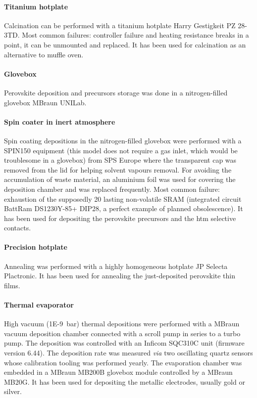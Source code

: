		\paragraph{Titanium hotplate}
		Calcination can be performed with a titanium hotplate Harry Gestigkeit PZ 28-3TD.
		Most common failures: controller failure and heating resistance breaks in a point, it can be unmounted and replaced.
		It has been used for calcination as an alternative to muffle oven.

		\paragraph{Glovebox}
		Perovskite deposition and precursors storage was done in a nitrogen-filled glovebox MBraun UNILab.

		\paragraph{Spin coater in inert atmosphere}
		Spin coating depositions in the nitrogen-filled glovebox were performed with a SPIN150 equipment (this model does not require a gas inlet, which would be troublesome in a glovebox) from SPS Europe where the transparent cap was removed from the lid for helping solvent vapours removal.
		For avoiding the accumulation of waste material, an aluminium foil was used for covering the deposition chamber and was replaced frequently.
		Most common failure: exhaustion of the supposedly \SI{20}{\year} lasting non-volatile SRAM (integrated circuit BattRam DS1230Y-85+ DIP28, a perfect example of planned obsolescence).
		It has been used for depositing the perovskite precursors and the \gls{htm} selective contacts.

		\paragraph{Precision hotplate}
		Annealing was performed with a highly homogeneous hotplate JP Selecta Plactronic.
		It has been used for annealing the just-deposited perovskite thin films.

		\paragraph{Thermal evaporator}
		High vacuum (\SI{1E-9}{\bar}) thermal depositions were performed with a MBraun vacuum deposition chamber connected with a scroll pump in series to a turbo pump.
		The deposition was controlled with an Inficom SQC310C unit (firmware version 6.44).
		The deposition rate was measured \textit{via} two oscillating quartz sensors whose calibration tooling was performed yearly.
		The evaporation chamber was embedded in a MBraun MB200B glovebox module controlled by a MBraun MB20G.
		It has been used for depositing the metallic electrodes, usually gold or silver.

